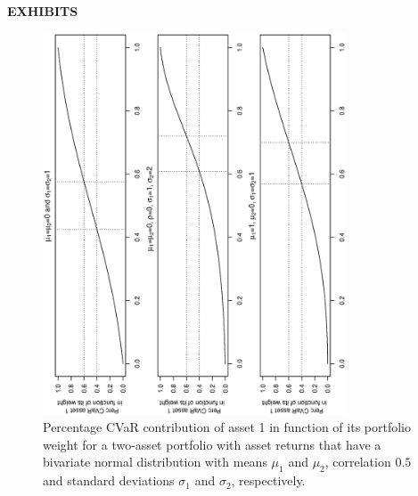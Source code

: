 \documentclass[11pt]{article}
\begin{document}
{\bf  \large \noindent EXHIBITS}

\setcounter{page}{17}


\bigskip


\begin{figure}[h]
\begin{center}
\caption{Percentage CVaR contribution of asset 1 in function of its portfolio weight for a two-asset portfolio with asset returns that have a bivariate normal distribution with means $\mu_1$ and $\mu_2$, correlation $0.5$ and standard deviations $\sigma_1$ and $\sigma_2$, respectively.   }
\includegraphics[width=9cm,angle=270]{sensitivity_rho50.eps}
\end{center}
\end{figure}


\newpage
\end{document}
